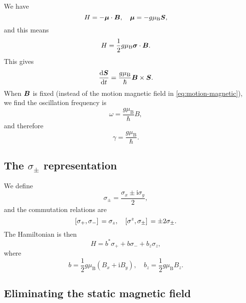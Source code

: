 \documentclass[hyperref, a4paper]{article}
\newcommand*{\ii}{\mathrm{i}}
\newcommand*{\muB}{\mu_{\text{B}}}
\begin{document}
We have 
\begin{equation}
    H = - \vb*{\mu} \cdot \vb*{B}, \quad \vb*{\mu} = - g \muB \vb*{S},
\end{equation}
and this means 
\begin{equation}
    H = \frac{1}{2} g \muB \vb*{\sigma} \cdot \vb*{B}.
\end{equation}
This gives
\begin{equation}
    \dv{\vb*{S}}{t} = \frac{g \muB}{\hbar} \vb*{B} \times \vb*{S}.
\end{equation}
When $\vb*{B}$ is fixed (instead of the motion magnetic field in \eqref{eq:motion-magnetic}),
we find the oscillation frequency is 
\begin{equation}
    \omega = \frac{g \muB}{\hbar} B,
\end{equation}
and therefore 
\begin{equation}
    \gamma = \frac{g \muB}{\hbar}.
\end{equation}

\subsection{The $\sigma_{\pm}$ representation}

We define 
\begin{equation}
    \sigma_\pm = \frac{\sigma_x \pm \ii \sigma_y}{2}, 
\end{equation}
and the commutation relations are 
\begin{equation}
    \comm*{\sigma_+}{\sigma_-} =  \sigma_z, \quad 
    \comm*{\sigma^z}{\sigma_\pm} = \pm 2 \sigma_\pm.
\end{equation}
The Hamiltonian is then 
\begin{equation}
    H = b^* \sigma_+ + b \sigma_- + b_z \sigma_z, 
\end{equation}
where 
\begin{equation}
    b = \frac{1}{2} g \muB (B_x + \ii B_y), \quad 
    b_z = \frac{1}{2} g \muB B_z.
    \label{eq:b-def}
\end{equation}

\subsection{Eliminating the static magnetic field}
\end{document}
